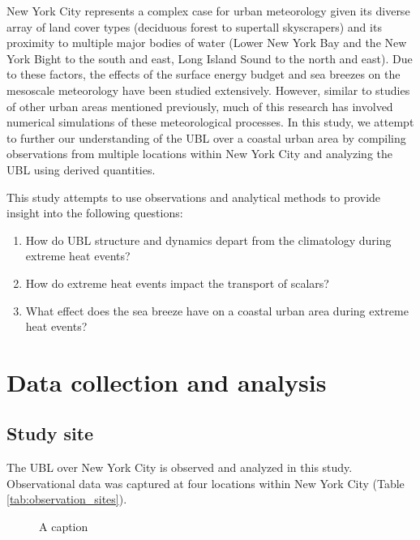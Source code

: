 \documentclass[num-refs]{wiley-article}
\begin{document}

New York City represents a complex case for urban meteorology given its diverse array of land cover types (deciduous forest to supertall skyscrapers) and its proximity to multiple major bodies of water (Lower New York Bay and the New York Bight to the south and east, Long Island Sound to the north and east). Due to these factors, the effects of the surface energy budget \citep{hrisko2021, ramamurthy2014, tewari2019} and sea breezes \citep{childs2005, colle2010, frizzola1963, gedzelman2003, melecio2018, thompson2007} on the mesoscale meteorology have been studied extensively. However, similar to studies of other urban areas mentioned previously, much of this research has involved numerical simulations of these meteorological processes. In this study, we attempt to further our understanding of the UBL over a coastal urban area by compiling observations from multiple locations within New York City and analyzing the UBL using derived quantities.

This study attempts to use observations and analytical methods to provide insight into the following questions:

\begin{enumerate}
  \item How do UBL structure and dynamics depart from the climatology during extreme heat events?
  \item How do extreme heat events impact the transport of scalars?
  \item What effect does the sea breeze have on a coastal urban area during extreme heat events?
\end{enumerate}


\section{Data collection and analysis}

\subsection{Study site}
The UBL over New York City is observed and analyzed in this study. Observational data was captured at four locations within New York City (Table \ref{tab:observation_sites}).

\begin{figure*}[t!]
	\centering
	\label{fig:study_site}
	\caption{A caption}
\end{figure*}
 
\end{document}
